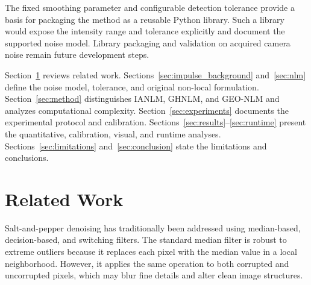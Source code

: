 \documentclass[pdflatex,iicol,sn-mathphys-num]{sn-jnl}
\newif\ifshowportuguese
\newcommand{\pt}[1]{\ifshowportuguese\par\begingroup\small\color{blue!55!black}\noindent\textbf{PT: }#1\par\endgroup\fi}
\begin{document}
The fixed smoothing parameter and configurable detection tolerance provide a basis for packaging the method as a reusable Python library. Such a library would expose the intensity range and tolerance explicitly and document the supported noise model. Library packaging and validation on acquired camera noise remain future development steps.
\pt{O parâmetro de suavização fixo e a tolerância configurável fornecem uma base para empacotar o método como uma biblioteca Python reutilizável. Essa biblioteca disponibilizaria explicitamente a escala de intensidade e a tolerância e documentaria o modelo de ruído suportado. O empacotamento e a validação com ruído adquirido por câmeras permanecem como etapas futuras.}


Section~\ref{sec:related} reviews related work. Sections~\ref{sec:impulse_background} and~\ref{sec:nlm} define the noise model, tolerance, and original non-local formulation. Section~\ref{sec:method} distinguishes IANLM, GHNLM, and GEO-NLM and analyzes computational complexity. Section~\ref{sec:experiments} documents the experimental protocol and calibration. Sections~\ref{sec:results}--\ref{sec:runtime} present the quantitative, calibration, visual, and runtime analyses. Sections~\ref{sec:limitations} and~\ref{sec:conclusion} state the limitations and conclusions.
\pt{A Seção~\ref{sec:related} revisa os trabalhos relacionados. As Seções~\ref{sec:impulse_background} e~\ref{sec:nlm} definem o modelo de ruído, a tolerância e a formulação não local original. A Seção~\ref{sec:method} distingue IANLM, GHNLM e GEO-NLM e analisa a complexidade computacional. A Seção~\ref{sec:experiments} documenta o protocolo experimental e a calibração. As Seções~\ref{sec:results}--\ref{sec:runtime} apresentam as análises quantitativas, de calibração, visuais e de tempo. As Seções~\ref{sec:limitations} e~\ref{sec:conclusion} apresentam as limitações e conclusões.}


\section{Related Work}
\label{sec:related}

Salt-and-pepper denoising has traditionally been addressed using median-based, decision-based, and switching filters. The standard median filter is robust to extreme outliers because it replaces each pixel with the median value in a local neighborhood. However, it applies the same operation to both corrupted and uncorrupted pixels, which may blur fine details and alter clean image structures.
\pt{A remoção de ruído sal-e-pimenta tem sido tradicionalmente tratada por filtros baseados em mediana, filtros baseados em decisão e filtros com chaveamento. O filtro de mediana padrão é robusto a outliers extremos porque substitui cada pixel pelo valor mediano em uma vizinhança local. No entanto, ele aplica a mesma operação tanto a pixels corrompidos quanto a pixels não corrompidos, o que pode borrar detalhes finos e alterar estruturas limpas da imagem.}
\end{document}
